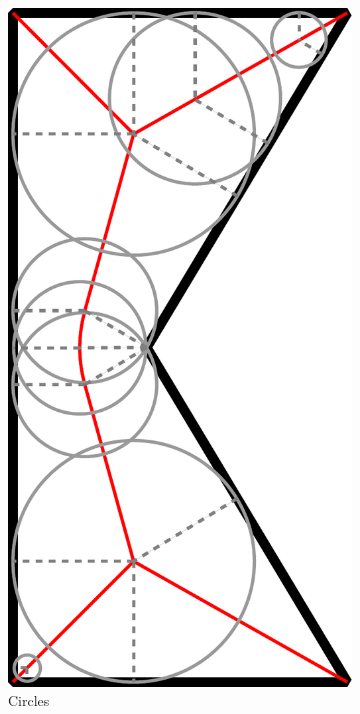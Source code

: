 \begin{figure}
\centering
\begin{subfigure}{0.3\columnwidth}
\centering
\includegraphics[height=1.5\columnwidth]{sources/method/MAT_explanation_circles.pdf}
\caption{Circles}
\label{MAT_explanation_circles}
\end{subfigure}
\begin{subfigure}{0.3\columnwidth}
\centering

\end{subfigure}
\end{figure}
